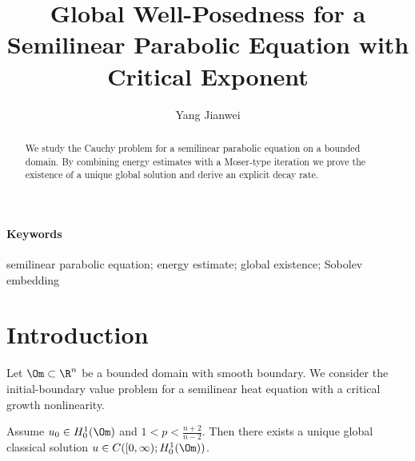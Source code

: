 





























\title{Global Well-Posedness for a Semilinear Parabolic Equation with Critical Exponent}
\author{Yang Jianwei}
\date{}

\maketitle
\ifdefined\YTfallback
\noindent{}
\bigskip
\fi
\begin{abstract}
We study the Cauchy problem for a semilinear parabolic equation on a bounded domain. By combining energy estimates with a Moser-type iteration we prove the existence of a unique global solution and derive an explicit decay rate.
\end{abstract}
\paragraph{Keywords} semilinear parabolic equation; energy estimate; global existence; Sobolev embedding

\section{Introduction}
Let $\Om\subset\R^n$ be a bounded domain with smooth boundary. We consider the initial-boundary value problem for a semilinear heat equation with a critical growth nonlinearity.

\begin{theorem}
Assume $u_0\in H^1_0(\Om)$ and $1<p<\frac{n+2}{n-2}$. Then there exists a unique global classical solution $u\in C([0,\infty);H^1_0(\Om))$.
\end{theorem}

